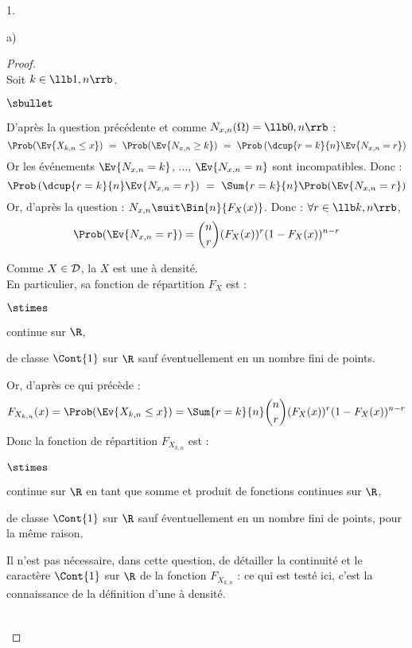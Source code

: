 \documentclass[11pt]{article}%
\begin{document}
\begin{noliste}{1.}
\begin{noliste}{a)}
    \begin{proof}~\\
    Soit $k \in \llb 1,n \rrb$.
    \begin{noliste}{$\sbullet$}
      \item D'après la question précédente et comme $N_{x,n}(\Omega)
      =\llb 0,n \rrb$ :
      \[
        \Prob(\Ev{X_{k,n} \leq x}) \ = \ \Prob(\Ev{N_{x,n}\geq k})
        \ = \ \Prob\left( \dcup{r=k}{n} \Ev{N_{x,n}=r}\right)
      \]
      Or les événements $\Ev{N_{x,n}=k}$, $\ldots$, 
      $\Ev{N_{x,n}=n}$ sont incompatibles. Donc :
      \[
        \Prob\left(\dcup{r=k}{n} \Ev{N_{x,n}=r}\right) 
        \ = \ \Sum{r=k}{n} \Prob(\Ev{N_{x,n}=r})
      \]
      Or, d'après la question  : $N_{x,n} \suit 
      \Bin{n}{F_X(x)}$. Donc : $\forall r \in \llb k,n \rrb$,
      \[
        \Prob(\Ev{N_{x,n}=r}) = \dbinom{n}{r} (F_X(x))^r
        (1-F_X(x))^{n-r}
      \]
      
      \item Comme $X \in {\cal D}$, la \var $X$ est une \var à 
      densité.\\
      En particulier, sa fonction de répartition $F_X$ est :
      \begin{noliste}{$\stimes$}
	\item continue sur $\R$,
	\item de classe $\Cont{1}$ sur $\R$ sauf éventuellement 
	en un nombre fini de points.
      \end{noliste}
      Or, d'après ce qui précède :
      \[
        F_{X_{k,n}}(x) = \Prob(\Ev{X_{k,n} \leq x})
        = \Sum{r=k}{n} \dbinom{n}{r} (F_X(x))^r 
        (1-F_X(x))^{n-r}
      \]
      Donc la fonction de répartition $F_{X_{k,n}}$ est :
      \begin{noliste}{$\stimes$}
	\item continue sur $\R$ en tant que somme et 
	produit de fonctions continues sur $\R$,
	\item de classe $\Cont{1}$ sur $\R$ sauf éventuellement
	en un nombre fini de points, pour la même raison.
      \end{noliste}
    \end{noliste}
    
    \begin{remark}
      Il n'est pas nécessaire, dans cette question, de détailler 
      la continuité et le caractère $\Cont{1}$ sur $\R$ de la fonction
      $F_{X_{k,n}}$ : ce qui est testé ici, c'est la connaissance de la 
      définition d'une \var à densité.
    \end{remark}~\\[-1.4cm]
    \end{proof}
  \end{noliste}


\end{noliste}
\end{document}
